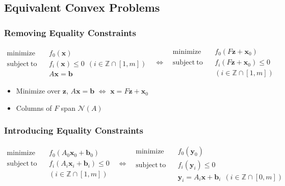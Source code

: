 \subsection{Equivalent Convex Problems}

\subsubsection*{Removing Equality Constraints}
\begin{equation}\begin{aligned}
    \mathrm{minimize}~~&~~f_0(\mathbf{x}) \\
    \mathrm{subject~to}~~&~~f_i(\mathbf{x}) \leq 0~~(i \in \mathbb{Z} \cap [1,m])\\
        &~~A\mathbf{x} = \mathbf{b}
\end{aligned}~~~\Leftrightarrow~~~\begin{aligned}
    \mathrm{minimize}~~&~~f_0(F\mathbf{z} + \mathbf{x}_0) \\
    \mathrm{subject~to}~~&~~f_i(F\mathbf{z} + \mathbf{x}_0) \leq 0\\
        &~~(i \in \mathbb{Z} \cap [1,m])
\end{aligned}\end{equation}
\begin{itemize}
    \item Minimize over $\mathbf{z}$, $A\mathbf{x} = \mathbf{b}$ $\Leftrightarrow$ $\mathbf{x} = F\mathbf{z} + \mathbf{x}_0$
    \item Columns of $F$ span $\mathcal{N}(A)$
\end{itemize}

\subsubsection*{Introducing Equality Constraints}
\begin{equation}\begin{aligned}
    \mathrm{minimize}~~&~~f_0(A_0\mathbf{x}_0 + \mathbf{b}_0) \\
    \mathrm{subject~to}~~&~~f_i(A_i\mathbf{x}_i + \mathbf{b}_i) \leq 0\\
        &~~(i \in \mathbb{Z} \cap [1,m])
\end{aligned}~~~\Leftrightarrow~~~\begin{aligned}
    \mathrm{minimize}~~&~~f_0(\mathbf{y}_0) \\
    \mathrm{subject~to}~~&~~f_i(\mathbf{y}_i) \leq 0 \\
        &~~\mathbf{y}_i = A_i \mathbf{x} + \mathbf{b}_i~~(i \in \mathbb{Z} \cap [0,m])
\end{aligned}\end{equation}

